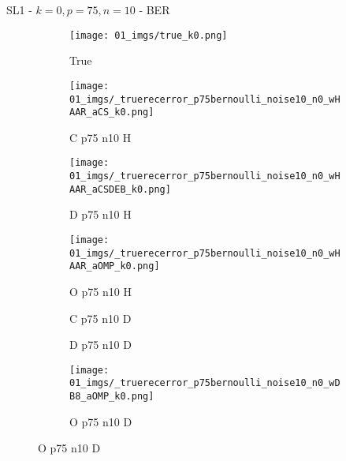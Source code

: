 \begin{frame}{SL1 - $k=0,p=75,n=10$ - BER}{}
\begin{figure}
\begin{subfigure}{0.13\textwidth}
\texttt{[image: 01\_imgs/true\_k0.png]}
\caption*{\tiny True}
\end{subfigure}
\begin{subfigure}{0.13\textwidth}
\texttt{[image: 01\_imgs/\_truerecerror\_p75bernoulli\_noise10\_n0\_wHAAR\_aCS\_k0.png]}
\caption*{\tiny C p75 n10 H}
\end{subfigure}
\begin{subfigure}{0.13\textwidth}
\texttt{[image: 01\_imgs/\_truerecerror\_p75bernoulli\_noise10\_n0\_wHAAR\_aCSDEB\_k0.png]}
\caption*{\tiny D p75 n10 H}
\end{subfigure}
\begin{subfigure}{0.13\textwidth}
\texttt{[image: 01\_imgs/\_truerecerror\_p75bernoulli\_noise10\_n0\_wHAAR\_aOMP\_k0.png]}
\caption*{\tiny O p75 n10 H}
\end{subfigure}
\begin{subfigure}{0.13\textwidth}
\caption*{\tiny C p75 n10 D}
\end{subfigure}
\begin{subfigure}{0.13\textwidth}
\caption*{\tiny D p75 n10 D}
\end{subfigure}
\begin{subfigure}{0.13\textwidth}
\texttt{[image: 01\_imgs/\_truerecerror\_p75bernoulli\_noise10\_n0\_wDB8\_aOMP\_k0.png]}
\caption*{\tiny O p75 n10 D}
\end{subfigure}
\end{figure}
\end{frame}

